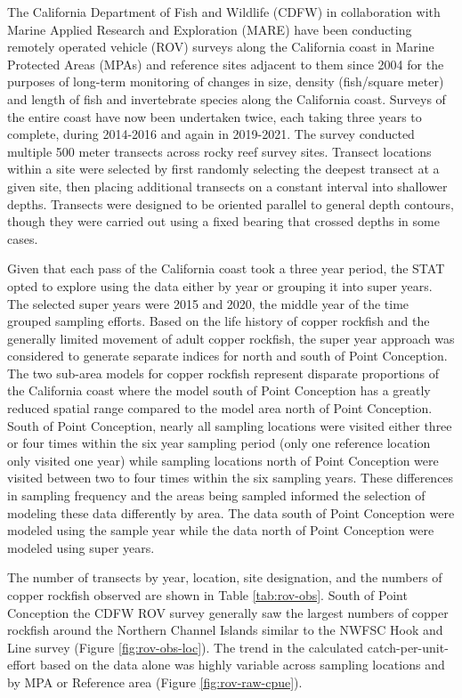 \documentclass[11pt,
  english,
  letterpaper,
]{article}
\begin{document}
\hfill\break

The California Department of Fish and Wildlife (CDFW) in collaboration with Marine Applied Research and Exploration (MARE) have been conducting remotely operated vehicle (ROV) surveys along the California coast in Marine Protected Areas (MPAs) and reference sites adjacent to them since 2004 for the purposes of long-term monitoring of changes in size, density (fish/square meter) and length of fish and invertebrate species along the California coast. Surveys of the entire coast have now been undertaken twice, each taking three years to complete, during 2014-2016 and again in 2019-2021. The survey conducted multiple 500 meter transects across rocky reef survey sites. Transect locations within a site were selected by first randomly selecting the deepest transect at a given site, then placing additional transects on a constant interval into shallower depths. Transects were designed to be oriented parallel to general depth contours, though they were carried out using a fixed bearing that crossed depths in some cases.

Given that each pass of the California coast took a three year period, the STAT opted to explore using the data either by year or grouping it into super years. The selected super years were 2015 and 2020, the middle year of the time grouped sampling efforts. Based on the life history of copper rockfish and the generally limited movement of adult copper rockfish, the super year approach was considered to generate separate indices for north and south of Point Conception. The two sub-area models for copper rockfish represent disparate proportions of the California coast where the model south of Point Conception has a greatly reduced spatial range compared to the model area north of Point Conception. South of Point Conception, nearly all sampling locations were visited either three or four times within the six year sampling period (only one reference location only visited one year) while sampling locations north of Point Conception were visited between two to four times within the six sampling years. These differences in sampling frequency and the areas being sampled informed the selection of modeling these data differently by area. The data south of Point Conception were modeled using the sample year while the data north of Point Conception were modeled using super years.

The number of transects by year, location, site designation, and the numbers of copper rockfish observed are shown in Table \ref{tab:rov-obs}. South of Point Conception the CDFW ROV survey generally saw the largest numbers of copper rockfish around the Northern Channel Islands similar to the NWFSC Hook and Line survey (Figure \ref{fig:rov-obs-loc}). The trend in the calculated catch-per-unit-effort based on the data alone was highly variable across sampling locations and by MPA or Reference area (Figure \ref{fig:rov-raw-cpue}).
\end{document}
